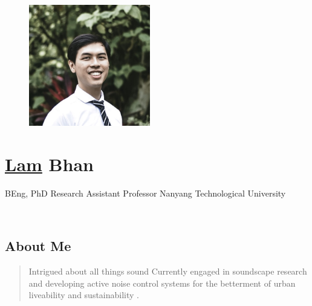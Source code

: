 \documentclass[
]{report}
\author{}
\date{}
\begin{document}
\ifdefined\Shaded\renewenvironment{Shaded}{\begin{tcolorbox}[boxrule=0pt, sharp corners, borderline west={3pt}{0pt}{shadecolor}, enhanced, frame hidden, breakable, interior hidden]}{\end{tcolorbox}}\fi

\hypertarget{profile-pic}{}
\begin{figure}

{\centering \includegraphics[width=2.08333in,height=\textheight]{images/profile.jpg}

}

\end{figure}

\hypertarget{lam-bhan}{%
\section{\texorpdfstring{\ul{Lam} Bhan}{Lam Bhan}}\label{lam-bhan}}

BEng, PhD  Research Assistant Professor
 Nanyang Technological University

\href{https://scholar.google.com.sg/citations?user=22NFnNsAAAAJ\&hl=en}{}~~
\href{https://orcid.org/0000-0001-5193-6560}{}~~
\href{https://www.webofscience.com/wos/author/record/O-2911-2013}{}~~
\href{https://www.researchgate.net/profile/Bhan-Lam}{}~~
\href{https://github.com/bhanlam}{}~~
\href{https://twitter.com/bhanlam}{}~~
\href{https://www.linkedin.com/in/lambhan/}{}~~
\href{mailto:bhanlam@ntu.edu.sg}{}

\hypertarget{fa-hand-point-up-about-me}{%
\subsection{\texorpdfstring{ About
Me}{ About Me}}\label{fa-hand-point-up-about-me}}

\begin{quote}
Intrigued about all things sound  Currently engaged
in soundscape research and developing active noise control systems for
the betterment of urban liveability and sustainability
.
\end{quote}
\end{document}
